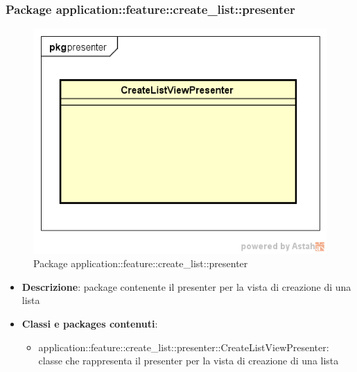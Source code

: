 \subsubsection{Package application::feature::create\_list::presenter}
\label{Package application::feature::create_list::presenter}
\begin{figure}[H]
	\centering
	\includegraphics[scale=0.5]{Sezioni/Packages/Application/create_list_presenter.png}
	\caption{Package application::feature::create\_list::presenter}
\end{figure}
\begin{itemize}
	\item \textbf{Descrizione}: package contenente il presenter per la vista di creazione di una lista
	\item \textbf{Classi e packages contenuti}:
	\begin{itemize}
	\item application::feature::create\_list::presenter::CreateListViewPresenter: classe che rappresenta il presenter per la vista di creazione di una lista
	\end{itemize}
\end{itemize}

